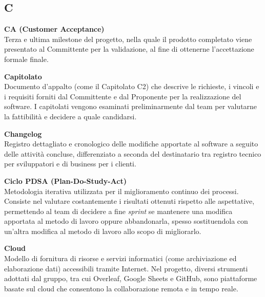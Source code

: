 \documentclass[12pt, a4paper]{article}
\begin{document}
\subsection*{C}
{}
\vspace{0.2cm}

\noindent\hypertarget{ca}{\textbf{CA (Customer Acceptance)}} \\[0.1em]
Terza e ultima milestone del progetto, nella quale il prodotto completato viene presentato al Committente per la validazione, al fine di ottenerne l'accettazione formale finale.
\vspace{0.5cm}

\noindent\hypertarget{capitolato}{\textbf{Capitolato}} \\[0.1em]
Documento d'appalto (come il Capitolato C2) che descrive le richieste, i vincoli e i requisiti forniti dal Committente e dal Proponente per la realizzazione del software. I capitolati vengono esaminati preliminarmente dal team per valutarne la fattibilità e decidere a quale candidarsi.
\vspace{0.5cm}

\noindent\hypertarget{changelog}{\textbf{Changelog}} \\[0.1em]
Registro dettagliato e cronologico delle modifiche apportate al software a seguito delle attività concluse, differenziato a seconda del destinatario tra registro tecnico per sviluppatori e di business per i clienti.
\vspace{0.5cm}

\noindent\hypertarget{ciclo-pdsa}{\textbf{Ciclo PDSA (Plan-Do-Study-Act)}} \\[0.1em]
Metodologia iterativa utilizzata per il miglioramento continuo dei processi. Consiste nel valutare costantemente i risultati ottenuti rispetto alle aspettative, permettendo al team di decidere a fine \textit{sprint} se mantenere una modifica apportata al metodo di lavoro oppure abbandonarla, spesso sostituendola con un'altra modifica al metodo di lavoro allo scopo di migliorarlo.
\vspace{0.5cm}

\noindent\hypertarget{cloud}{\textbf{Cloud}} \\[0.1em]
Modello di fornitura di risorse e servizi informatici (come archiviazione ed elaborazione dati) accessibili tramite Internet. Nel progetto, diversi strumenti adottati dal gruppo, tra cui Overleaf, Google Sheets e GitHub, sono piattaforme basate sul cloud che consentono la collaborazione remota e in tempo reale.
\vspace{0.5cm}  
\end{document}
